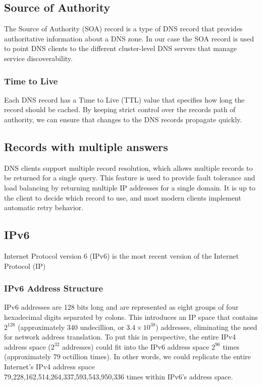 \documentclass[12pt]{article}
\begin{document}
\subsection{Source of Authority}
The Source of Authority (SOA) record is a type of DNS record that provides authoritative information about a DNS zone.
In our case the SOA record is used to point DNS clients to the different cluster-level DNS servers that manage service discoverability.

\subsubsection{Time to Live}
Each DNS record has a Time to Live (TTL) value that specifies how long the record should be cached.
By keeping strict control over the records path of authority, we can ensure that changes to the DNS records propagate quickly.

\subsection{Records with multiple answers}
DNS clients support multiple record resolution, which allows multiple records to be returned for a single query.
This feature is used to provide fault tolerance and load balancing by returning multiple IP addresses for a single domain.
It is up to the client to decide which record to use, and most modern clients implement automatic retry behavior.

\subsection{IPv6}
Internet Protocol version 6 (IPv6)\cite{hindenInternetProtocolVersion1998} is the most recent version of the Internet Protocol (IP)
\subsubsection{IPv6 Address Structure}
IPv6 addresses are 128 bits long and are represented as eight groups of four hexadecimal digits separated by colons.
This introduces an IP space that contains $2^{128}$ (approximately 340 undecillion, or $3.4 \times 10^{38}$) addresses, 
eliminating the need for network address translation. 
To put this in perspective, the entire IPv4 address space ($2^{32}$ addresses) could fit into the IPv6 address space $2^{96}$ times 
(approximately 79 octillion times).
In other words, we could replicate the entire Internet's IPv4 address space \\79,228,162,514,264,337,593,543,950,336 times within IPv6's address space.
\end{document}
